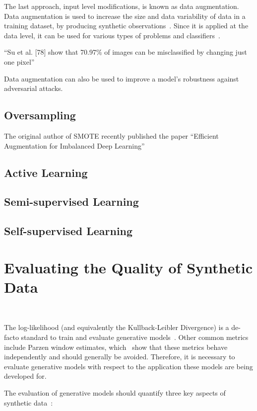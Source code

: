 \documentclass[parskip=full]{scrartcl}
\begin{document}
The last approach, input level modifications, is known as data augmentation.
Data augmentation is used to increase the size and data variability of data in
a training dataset, by producing synthetic observations~\cite{Van2001,
Wong2016}. Since it is applied at the data level, it can be used for various
types of problems and classifiers~\cite{Behpour2019}. 


``Su et al. [78] show that 70.97\% of images can be misclassified by changing
just one pixel'' \citet{shorten2019survey}

Data augmentation can also be used to improve a model's robustness against
adversarial attacks. 

\subsection{Oversampling}

The original author of SMOTE recently published the paper ``Efficient Augmentation for Imbalanced Deep
Learning''~\cite{dablain2022efficient}

\subsection{Active Learning}

\subsection{Semi-supervised Learning}

\subsection{Self-supervised Learning}

\section{Evaluating the Quality of Synthetic Data
}~\label{sec:evaluating-synthetic-data}

The log-likelihood (and equivalently the Kullback-Leibler Divergence) is a
de-facto standard to train and evaluate generative
models~\cite{theis2016note}. Other common metrics include Parzen window
estimates, which~\citet{theis2016note} show that these metrics behave
independently and should generally be avoided. Therefore, it is necessary
to evaluate generative models with respect to the application these models are
being developed for.


The evaluation of generative models should quantify three key aspects of
synthetic data~\cite{alaa2022faithful}:
\end{document}

